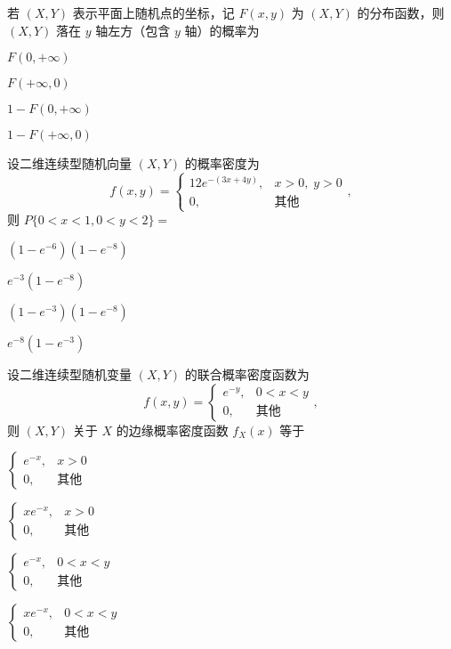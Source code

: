 \documentclass{exam-zh}
\begin{document}
\begin{question}
  若 $(X, Y)$ 表示平面上随机点的坐标，记 $F(x, y)$ 为 $(X, Y)$ 的分布函数，则 $(X, Y)$ 落在 $y$ 轴左方（包含 $y$ 轴）的概率为 \paren[A]
  \begin{choices}
    \item $F(0, +\infty)$  
    \item $F(+ \infty, 0)$  
    \item $1 - F(0, +\infty)$  
    \item $1 - F(+ \infty, 0)$  
  \end{choices}
\end{question}

\begin{question}
  设二维连续型随机向量 $(X, Y)$ 的概率密度为  
  $$f(x, y) = 
  \begin{cases} 
  12e^{-(3x+4y)}, & x > 0, \; y > 0 \\ 
  0, & \text{其他} 
  \end{cases},$$  
  则 $P\{0 < x < 1, 0 < y < 2\} = $ \paren[C]
  \begin{choices}
    \item $(1 - e^{-6})(1 - e^{-8})$  
    \item $e^{-3}(1 - e^{-8})$  
    \item $(1 - e^{-3})(1 - e^{-8})$  
    \item $e^{-8}(1 - e^{-3})$  
  \end{choices}
\end{question}

\begin{question}
  设二维连续型随机变量 $(X, Y)$ 的联合概率密度函数为  
  $$f(x, y) = 
  \begin{cases} 
  e^{-y}, & 0 < x < y \\ 
  0, & \text{其他} 
  \end{cases},$$  
  则 $(X, Y)$ 关于 $X$ 的边缘概率密度函数 $f_X(x)$ 等于 \paren[A]
  \begin{choices}
    \item 
    $
    \begin{cases} 
    e^{-x}, & x > 0 \\ 
    0, & \text{其他} 
    \end{cases}$
    
    \item 
    $
    \begin{cases} 
    xe^{-x}, & x > 0 \\ 
    0, & \text{其他} 
    \end{cases}$
    
    \item 
    $
    \begin{cases} 
    e^{-x}, & 0 < x < y \\ 
    0, & \text{其他} 
    \end{cases}$
    
    \item 
    $
    \begin{cases} 
    xe^{-x}, & 0 < x < y \\ 
    0, & \text{其他} 
    \end{cases}$
  \end{choices}
\end{question}
\end{document}
